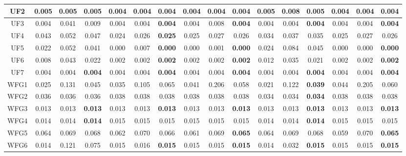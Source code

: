 \begin{table}[]
{\begin{tabular}{c|c|c|c|c|c|c|c|c|c|c|c|c|c|c|c|}
\multicolumn{1}{|c|}{UF2} & 0.005 & 0.005 & 0.005 & 0.004 & 0.004 & \textbf{0.004} & 0.004 & 0.004 & \textbf{0.004} & 0.005 & 0.008 & 0.005 & 0.004 & 0.004 & \textbf{0.004} \\ \hline
\multicolumn{1}{|c|}{UF3} & 0.004 & 0.041 & 0.009 & 0.004 & 0.004 & \textbf{0.004} & 0.004 & 0.008 & \textbf{0.004} & 0.004 & 0.004 & \textbf{0.004} & 0.004 & 0.004 & \textbf{0.004} \\ \hline
\multicolumn{1}{|c|}{UF4} & 0.043 & 0.052 & 0.047 & 0.024 & 0.026 & \textbf{0.025} & 0.025 & 0.027 & 0.026 & 0.034 & 0.037 & 0.035 & 0.025 & 0.027 & 0.026 \\ \hline
\multicolumn{1}{|c|}{UF5} & 0.022 & 0.052 & 0.041 & 0.000 & 0.007 & \textbf{0.000} & 0.000 & 0.001 & \textbf{0.000} & 0.024 & 0.084 & 0.045 & 0.000 & 0.000 & \textbf{0.000} \\ \hline
\multicolumn{1}{|c|}{UF6} & 0.008 & 0.043 & 0.022 & 0.002 & 0.002 & \textbf{0.002} & 0.002 & 0.002 & \textbf{0.002} & 0.012 & 0.035 & 0.021 & 0.002 & 0.002 & \textbf{0.002} \\ \hline
\multicolumn{1}{|c|}{UF7} & 0.004 & 0.004 & \textbf{0.004} & 0.004 & 0.004 & \textbf{0.004} & 0.004 & 0.004 & \textbf{0.004} & 0.004 & 0.004 & \textbf{0.004} & 0.004 & 0.004 & \textbf{0.004} \\ \hline
\multicolumn{1}{|c|}{WFG1} & 0.025 & 0.131 & 0.045 & 0.035 & 0.105 & 0.065 & 0.041 & 0.206 & 0.058 & 0.021 & 0.122 & \textbf{0.039} & 0.044 & 0.205 & 0.060 \\ \hline
\multicolumn{1}{|c|}{WFG2} & 0.036 & 0.036 & 0.036 & 0.038 & 0.038 & 0.038 & 0.038 & 0.038 & 0.038 & 0.034 & 0.034 & \textbf{0.034} & 0.038 & 0.038 & 0.038 \\ \hline
\multicolumn{1}{|c|}{WFG3} & 0.013 & 0.013 & \textbf{0.013} & 0.013 & 0.013 & \textbf{0.013} & 0.013 & 0.013 & \textbf{0.013} & 0.013 & 0.013 & \textbf{0.013} & 0.013 & 0.013 & \textbf{0.013} \\ \hline
\multicolumn{1}{|c|}{WFG4} & 0.014 & 0.014 & \textbf{0.014} & 0.015 & 0.015 & 0.015 & 0.015 & 0.015 & 0.015 & 0.014 & 0.014 & \textbf{0.014} & 0.015 & 0.015 & 0.015 \\ \hline
\multicolumn{1}{|c|}{WFG5} & 0.064 & 0.069 & 0.068 & 0.062 & 0.070 & 0.066 & 0.061 & 0.069 & \textbf{0.065} & 0.064 & 0.069 & 0.068 & 0.059 & 0.070 & \textbf{0.065} \\ \hline
\multicolumn{1}{|c|}{WFG6} & 0.014 & 0.121 & 0.075 & 0.015 & 0.016 & \textbf{0.015} & 0.015 & 0.015 & \textbf{0.015} & 0.014 & 0.032 & \textbf{0.015} & 0.015 & 0.015 & \textbf{0.015} \\ \hline

\end{tabular}}
\end{table}
